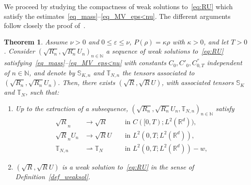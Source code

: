 \documentclass[11pt]{article}
\newtheorem{theo}{Theorem}[section]
\theoremstyle{definition}
\numberwithin{equation}{section}
\numberwithin{figure}{section}
\numberwithin{table}{section}
\newcommand*\<{\left\langle}
\renewcommand*\>{\right\rangle}
\renewcommand*\le{\leqslant}
\begin{document}
We proceed by studying the compactness of weak solutions to~\eqref{eq:RU} which satisfy the estimates~\eqref{eq_mass}--\eqref{eq_MV_eps<nu}. The different arguments follow closely the proof of~\cite[Theorem~2.1]{MelletVasseur}.

\begin{theo}\label{theo:compacite}
Assume $\nu >0$ and $0 \le \varepsilon \le \nu$, $P(\rho)=\kappa \rho$ with $\kappa >0$, and let $T>0$. Consider $(\sqrt{R_n}, \sqrt{R_n} U_n)_{n\in \mathbb N}$ a sequence of weak solutions to~\eqref{eq:RU} satisfying~\eqref{eq_mass}--\eqref{eq_MV_eps<nu} with constants $C_0,C'_0,C^{''}_{0,T}$ independent of $n \in \mathbb N$, and denote by $\mathbb S_{K,n}$ and $\mathbb T_{N,n}$ the tensors associated to $(\sqrt{R_n}, \sqrt{R_n} U_n)$. Then, there exists $(\sqrt{R},\sqrt{R}U)$, with associated tensors $\mathbb S_K$ and $\mathbb T_N$, such that:
\begin{enumerate}
\item \label{4.10.1} Up to the extraction of a subsequence, $(\sqrt{R_n},\sqrt{R_n} U_n,\mathbb T_{N,n})_{n\in \mathbb N}$ satisfy
\[
\begin{aligned}
\sqrt{R}_n &\to \sqrt{R} && \text{ in } C([0,T) ; L^2(\mathbb R^d)), \\
\sqrt{R}_n U_n &\to \sqrt{R}U &&\text{ in $L^2(0,T;L^2(\mathbb R^d)),$} \\
\mathbb T_{N,n} &\rightharpoonup \mathbb T_N && \text{ in $L^2(0,T;L^2(\mathbb R^d))-w$},
\end{aligned}
\]
\item \label{4.10.2} $(\sqrt{R},\sqrt{R} U)$ is a weak solution to~\eqref{eq:RU} in the sense of Definition~\ref{def_weaksol}.
\end{enumerate}
\end{theo}
\end{document}
